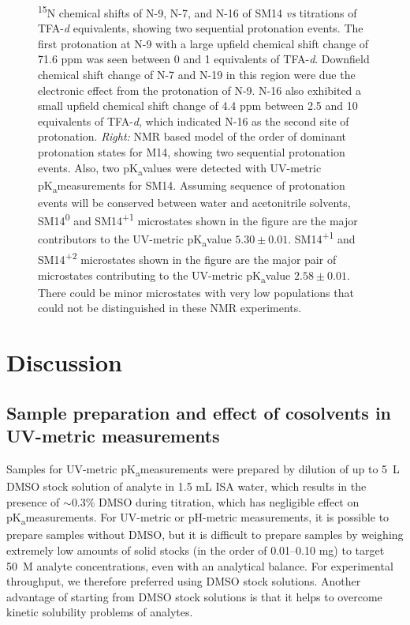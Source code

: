 \documentclass[9pt,lineno]{elife}
\newcommand{\pKa}{pK\textsubscript{a}}
\begin{document}
\begin{figure}
\begin{center}
{\textsuperscript{15}N chemical shifts of N-9, N-7, and N-16 of SM14 \textit{vs} titrations of TFA-\textit{d} equivalents, showing two sequential protonation events. The first protonation at N-9 with a large upfield chemical shift change of 71.6 ppm was seen between 0 and 1 equivalents of TFA-\textit{d}. Downfield chemical shift change of N-7 and N-19 in this region were due the electronic effect from the protonation of N-9. N-16 also exhibited a small upfield chemical shift change of 4.4 ppm between 2.5 and 10 equivalents of TFA-\textit{d}, which indicated N-16 as the second site of protonation. \textit{Right:} NMR based model of the order of dominant protonation states for M14, showing two sequential protonation events. Also, two \pKa values were detected with UV-metric \pKa measurements for SM14. Assuming sequence of protonation events will be conserved between water and acetonitrile solvents, SM14\textsuperscript{0} and SM14\textsuperscript{+1} microstates shown in the figure are the major contributors to the UV-metric \pKa value $5.30 \pm 0.01$. SM14\textsuperscript{+1} and SM14\textsuperscript{+2} microstates shown in the figure are the major pair of microstates contributing to the UV-metric \pKa value $2.58 \pm 0.01$. There could be minor microstates with very low populations that could not be distinguished in these NMR experiments.
}
\label{fig:NMR_microstates}
\end{center}
\end{figure}


\section{Discussion}

\subsection{Sample preparation and effect of cosolvents in UV-metric measurements}

Samples for UV-metric \pKa measurements were prepared by dilution of up to 5~\micro L DMSO stock solution of analyte in 1.5 mL ISA water, which results in the presence of $\sim$0.3\% DMSO during titration, which has negligible effect on \pKa measurements. 
For UV-metric or pH-metric measurements, it is possible to prepare samples without DMSO, but it is difficult to prepare samples by weighing extremely low amounts of solid stocks (in the order of 0.01--0.10 mg) to target 50~{\micro}M analyte concentrations, even with an analytical balance. 
For experimental throughput, we therefore preferred using DMSO stock solutions. 
Another advantage of starting from DMSO stock solutions is that it helps to overcome kinetic solubility problems of analytes.
\end{document}
